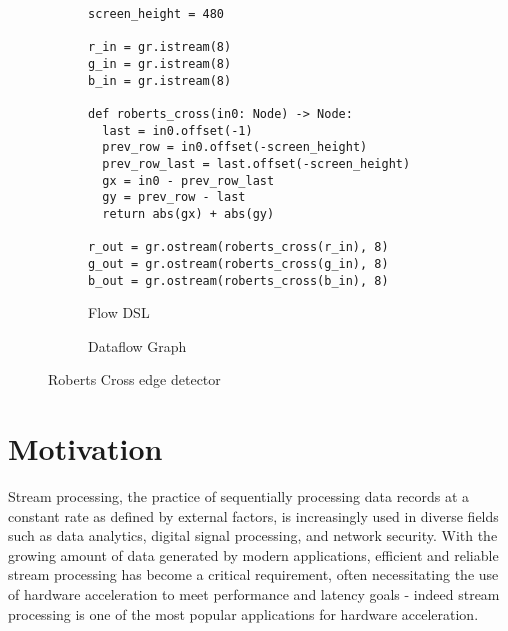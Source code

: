 \begin{figure}[H]
  \centering
  \begin{subfigure}[b]{0.5\textwidth}\centering
    \caption*{}
    \begin{verbatim}
screen_height = 480

r_in = gr.istream(8)
g_in = gr.istream(8)
b_in = gr.istream(8)

def roberts_cross(in0: Node) -> Node:
  last = in0.offset(-1)
  prev_row = in0.offset(-screen_height)
  prev_row_last = last.offset(-screen_height)
  gx = in0 - prev_row_last
  gy = prev_row - last
  return abs(gx) + abs(gy)

r_out = gr.ostream(roberts_cross(r_in), 8)
g_out = gr.ostream(roberts_cross(g_in), 8)
b_out = gr.ostream(roberts_cross(b_in), 8)
    \end{verbatim}
    \caption{Flow DSL}
  \end{subfigure}%
  \begin{subfigure}[b]{0.5\textwidth}\centering
    \caption*{}
    \caption{Dataflow Graph}
  \end{subfigure}
  \caption{Roberts Cross edge detector}\label{intro.dataflow}
\end{figure}

\section{Motivation}
Stream processing, the practice of sequentially processing data records at a constant rate as defined by external factors, is increasingly used in diverse fields such as data analytics, digital signal processing, and network security. With the growing amount of data generated by modern applications, efficient and reliable stream processing has become a critical requirement, often necessitating the use of hardware acceleration to meet performance and latency goals \hyphen{} indeed stream processing is one of the most popular applications for hardware acceleration.

